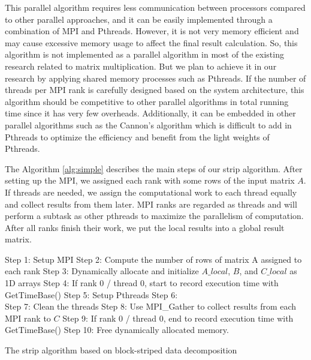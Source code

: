 \documentclass[conference]{IEEEtran}
\begin{document}
This parallel algorithm requires less communication between processors compared to other parallel approaches, and it can be easily implemented through a combination of MPI and Pthreads. However, it is not very memory efficient and may cause excessive memory usage to affect the final result calculation. So, this algorithm is not implemented as a parallel algorithm in most of the existing research related to matrix multiplication. But we plan to achieve it in our research by applying shared memory processes such as Pthreads. If the number of threads per MPI rank is carefully designed based on the system architecture, this algorithm should be competitive to other parallel algorithms in total running time since it has very few overheads. Additionally, it can be embedded in other parallel algorithms such as the Cannon's algorithm which is difficult to add in Pthreads to optimize the efficiency and benefit from the light weights of Pthreads.

The Algorithm \ref{alg:simple} describes the main steps of our strip algorithm. After setting up the MPI, we assigned each rank with some rows of the input matrix $A$. If threads are needed, we assign the computational work to each thread equally and collect results from them later. MPI ranks are regarded as threads and will perform a subtask as other pthreads to maximize the parallelism of computation. After all ranks finish their work, we put the local results into a global result matrix.

\begin{algorithm}[!htb]
\SetAlgoLined
{}
 \Begin
  {Step 1: Setup MPI\;
   Step 2: Compute the number of rows of matrix A assigned to each rank\;
   Step 3: Dynamically allocate and initialize $A\_local$, $B$, and $C\_local$ as 1D arrays\;
   Step 4: If rank 0 / thread 0, start to record execution time with GetTimeBase()\;
   Step 5: Setup Pthreads\; 
   Step 6:\\
    Step 7: Clean the threads\;
    Step 8: Use MPI\_Gather to collect results from each MPI rank to $C$\;
    Step 9: If rank 0 / thread 0, end to record execution time with GetTimeBase()\;
    Step 10: Free dynamically allocated memory.
  }
 \caption{The strip algorithm based on block-striped data decomposition}
 \label{alg:simple}
\end{algorithm}
\end{document}
